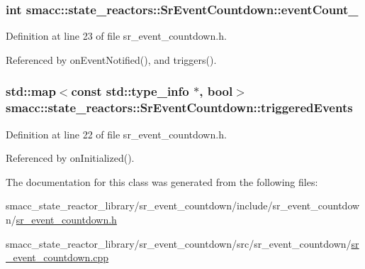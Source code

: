 \subsubsection[{\texorpdfstring{event\+Count\+\_\+}{eventCount_}}]{\setlength{\rightskip}{0pt plus 5cm}int smacc\+::state\+\_\+reactors\+::\+Sr\+Event\+Countdown\+::event\+Count\+\_\+\hspace{0.3cm}{\ttfamily [private]}}\hypertarget{classsmacc_1_1state__reactors_1_1SrEventCountdown_aa3b1de656f3d3cadadc47f00c4e0be86}{}\label{classsmacc_1_1state__reactors_1_1SrEventCountdown_aa3b1de656f3d3cadadc47f00c4e0be86}


Definition at line 23 of file sr\+\_\+event\+\_\+countdown.\+h.



Referenced by on\+Event\+Notified(), and triggers().

\subsubsection[{\texorpdfstring{triggered\+Events}{triggeredEvents}}]{\setlength{\rightskip}{0pt plus 5cm}std\+::map$<$const std\+::type\+\_\+info $\ast$, {\bf bool}$>$ smacc\+::state\+\_\+reactors\+::\+Sr\+Event\+Countdown\+::triggered\+Events\hspace{0.3cm}{\ttfamily [private]}}\hypertarget{classsmacc_1_1state__reactors_1_1SrEventCountdown_a6f9b3a51e8e8becbf76f99a5d0bcb8c5}{}\label{classsmacc_1_1state__reactors_1_1SrEventCountdown_a6f9b3a51e8e8becbf76f99a5d0bcb8c5}


Definition at line 22 of file sr\+\_\+event\+\_\+countdown.\+h.



Referenced by on\+Initialized().



The documentation for this class was generated from the following files\+:\begin{DoxyCompactItemize}
\item 
smacc\+\_\+state\+\_\+reactor\+\_\+library/sr\+\_\+event\+\_\+countdown/include/sr\+\_\+event\+\_\+countdown/\hyperlink{sr__event__countdown_8h}{sr\+\_\+event\+\_\+countdown.\+h}\item 
smacc\+\_\+state\+\_\+reactor\+\_\+library/sr\+\_\+event\+\_\+countdown/src/sr\+\_\+event\+\_\+countdown/\hyperlink{sr__event__countdown_8cpp}{sr\+\_\+event\+\_\+countdown.\+cpp}\end{DoxyCompactItemize}

